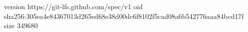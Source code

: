version https://git-lfs.github.com/spec/v1
oid sha256:305ea4e84367013d265ed68e38d00dc6f8102f5cad08a6b542776aaa84bcd17f
size 349680
